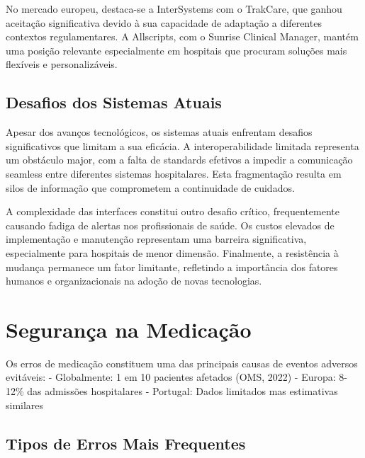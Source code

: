 No mercado europeu, destaca-se a InterSystems com o TrakCare, que ganhou aceitação significativa devido à sua capacidade de adaptação a diferentes contextos regulamentares. A Allscripts, com o Sunrise Clinical Manager, mantém uma posição relevante especialmente em hospitais que procuram soluções mais flexíveis e personalizáveis.


\subsection{Desafios dos Sistemas Atuais}

Apesar dos avanços tecnológicos, os sistemas atuais enfrentam desafios significativos que limitam a sua eficácia. A interoperabilidade limitada \cite{keasberry2017} representa um obstáculo major, com a falta de standards efetivos a impedir a comunicação seamless entre diferentes sistemas hospitalares. Esta fragmentação resulta em silos de informação que comprometem a continuidade de cuidados.

A complexidade das interfaces \cite{mcgreevey2020} constitui outro desafio crítico, frequentemente causando fadiga de alertas nos profissionais de saúde. Os custos elevados \cite{adler2021} de implementação e manutenção representam uma barreira significativa, especialmente para hospitais de menor dimensão. Finalmente, a resistência à mudança \cite{holden2011,venkatesh2003} permanece um fator limitante, refletindo a importância dos fatores humanos e organizacionais na adoção de novas tecnologias.

\section{Segurança na Medicação}


Os erros de medicação \cite{ciapponi2021,mulac2020} constituem uma das principais causas de eventos adversos evitáveis:
- Globalmente: 1 em 10 pacientes afetados (OMS, 2022)
- Europa: 8-12\% das admissões hospitalares %
- Portugal: Dados limitados mas estimativas similares \cite{dgs2020} %

\subsection{Tipos de Erros Mais Frequentes}

